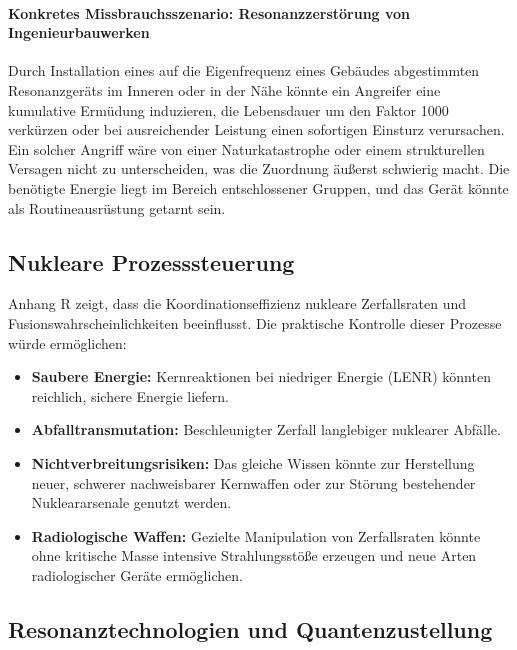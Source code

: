 \documentclass[12pt,a4paper]{article}
\theoremstyle{remark}
\begin{document}
	\paragraph{Konkretes Missbrauchsszenario: Resonanzzerstörung von Ingenieurbauwerken}
	Durch Installation eines auf die Eigenfrequenz eines Gebäudes abgestimmten Resonanzgeräts im Inneren oder in der Nähe könnte ein Angreifer eine kumulative Ermüdung induzieren, die Lebensdauer um den Faktor 1000 verkürzen oder bei ausreichender Leistung einen sofortigen Einsturz verursachen. Ein solcher Angriff wäre von einer Naturkatastrophe oder einem strukturellen Versagen nicht zu unterscheiden, was die Zuordnung äußerst schwierig macht. Die benötigte Energie liegt im Bereich entschlossener Gruppen, und das Gerät könnte als Routineausrüstung getarnt sein.
	
	\subsection{Nukleare Prozesssteuerung}
	\label{subsec:nuclear}
	
	Anhang R zeigt, dass die Koordinationseffizienz nukleare Zerfallsraten und Fusionswahrscheinlichkeiten beeinflusst. Die praktische Kontrolle dieser Prozesse würde ermöglichen:
	\begin{itemize}[leftmargin=*]
		\item \textbf{Saubere Energie:} Kernreaktionen bei niedriger Energie (LENR) könnten reichlich, sichere Energie liefern.
		\item \textbf{Abfalltransmutation:} Beschleunigter Zerfall langlebiger nuklearer Abfälle.
		\item \textbf{Nichtverbreitungsrisiken:} Das gleiche Wissen könnte zur Herstellung neuer, schwerer nachweisbarer Kernwaffen oder zur Störung bestehender Nukleararsenale genutzt werden.
		\item \textbf{Radiologische Waffen:} Gezielte Manipulation von Zerfallsraten könnte ohne kritische Masse intensive Strahlungsstöße erzeugen und neue Arten radiologischer Geräte ermöglichen.
	\end{itemize}
	
	\subsection{Resonanztechnologien und Quantenzustellung}
	\label{subsec:resonance}
	
\end{document}
